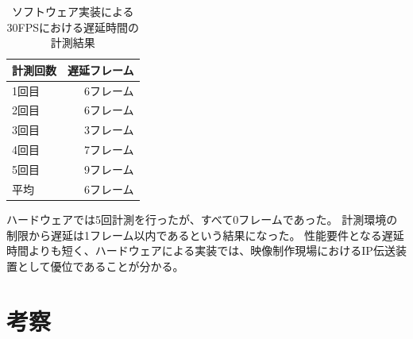 \begin{table}[htbp]
  \caption{ソフトウェア実装による30FPSにおける遅延時間の計測結果}
  \label{tb:evaluate-software-delay}
  \begin{center}
  \begin{tabular}{l|r}
    \hline
     計測回数 & 遅延フレーム \\\hline\hline
     1回目 & 6フレーム   \\\hline
     2回目 & 6フレーム   \\\hline
     3回目 & 3フレーム   \\\hline
     4回目 & 7フレーム   \\\hline
     5回目 & 9フレーム   \\\hline\hline
      平均 & 6フレーム   \\\hline
  \end{tabular}\end{center}
\end{table}

ハードウェアでは5回計測を行ったが、すべて0フレームであった。
計測環境の制限から遅延は1フレーム以内であるという結果になった。
性能要件となる遅延時間よりも短く、ハードウェアによる実装では、映像制作現場におけるIP伝送装置として優位であることが分かる。


\section{考察}
